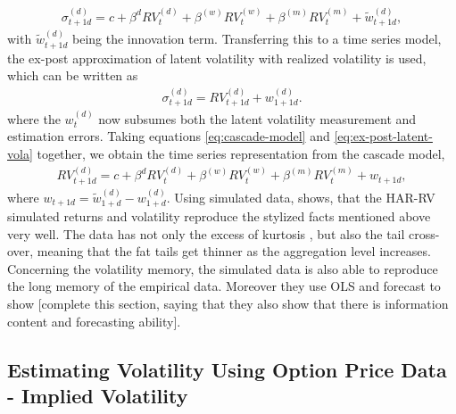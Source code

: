 \begin{align}\label{eq:cascade-model}
\sigma_{t+1d}^{(d)} = c + \beta^{d} RV_{t}^{(d)} + \beta^{(w)} RV_{t}^{(w)} + \beta^{(m)} RV_{t}^{(m)} + \tilde{w}_{t+1d}^{(d)},
\end{align}
with $\tilde{w}_{t+1d}^{(d)}$ being the innovation term.
Transferring this to a time series model, the ex-post approximation of latent volatility with realized volatility is used, which can be written as
\begin{align}\label{eq:ex-post-latent-vola}
\sigma_{t+1d}^{(d)} = RV_{t+1d}^{(d)} + w_{1+1d}^{(d)}.
\end{align}
where the $w_{t}^{(d)}$ now subsumes both the latent volatility measurement and estimation errors.  Taking equations \ref{eq:cascade-model} and \ref{eq:ex-post-latent-vola} together, we obtain the time series representation from the cascade model,
\begin{align}\label{eq:time-series-model}
RV_{t+1d}^{(d)} = c + \beta^{d} RV_{t}^{(d)} + \beta^{(w)} RV_{t}^{(w)} + \beta^{(m)} RV_{t}^{(m)} + w_{t+1d} ,
\end{align}
where $w_{t+1d} = \tilde{w}_{1+d}^{(d)} - w_{1+d}^{(d)}$. 
Using simulated data, \textcite{corsi2009} shows, that the HAR-RV simulated returns and volatility reproduce the stylized facts mentioned above very well. The data has not only the excess of kurtosis , but also the tail cross-over, meaning that the fat tails get thinner as the aggregation level increases. Concerning the volatility memory, the simulated data is also able to reproduce the long memory of the empirical data. Moreover they use OLS and forecast to show [complete this section, saying that they also show that there is information content and forecasting ability].


\subsection{Estimating Volatility Using Option Price Data - Implied Volatility}
